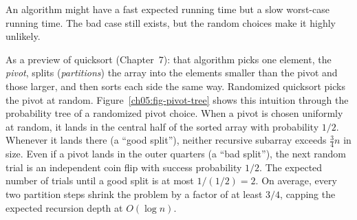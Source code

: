 \begin{trapbox}
An algorithm might have a fast expected running time but a slow worst-case running time. The bad case still exists, but the random choices make it highly unlikely.
\end{trapbox}

As a preview of quicksort (Chapter~7): that algorithm picks one element, the
\emph{pivot}, splits (\emph{partitions}) the array into the elements smaller than the
pivot and those larger, and then sorts each side the same way. Randomized quicksort picks
the pivot at random.
Figure~\ref{ch05:fig-pivot-tree} shows this intuition through the probability tree of a
randomized pivot choice. When a pivot is chosen uniformly at random, it lands in the
central half of the sorted array with probability $1/2$. Whenever it lands there (a ``good split''),
neither recursive subarray exceeds $\frac{3}{4}n$ in size. Even if a pivot lands in the outer
quarters (a ``bad split''), the next random trial is an independent coin flip with success
probability $1/2$. The expected number of trials until a good split is at most $1/(1/2) = 2$.
On average, every two partition steps shrink the problem by a factor of at least $3/4$,
capping the expected recursion depth at $O(\log n)$.


